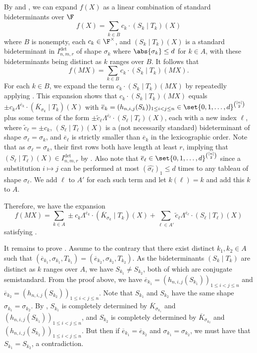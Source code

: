 \documentclass[letterpaper, 11pt]{amsart}
\begin{document}
\begin{pf}
By  and , we can expand $f(X)$ as a linear combination of standard bideterminants over $\F$
\[
    f(X)=\sum_{k \in B} c_k \cdot (S_k\mid T_k)(X)
\]
where $B$ is nonempty, each $c_k \in \F^\times$, and $(S_k \mid T_k)(X)$ is a standard bideterminant in $I^{\det}_{n,m,r}$ of shape $\sigma_k$ where $\abs{\sigma_k} \leq d$ for $k \in A$, with these bideterminants being distinct as $k$ ranges over $B$.
It follows that 
\[
    f(MX)=\sum_{k\in B} c_k \cdot (S_k\mid T_k)(MX).
\]
For each $k\in B$, we expand the term $c_k \cdot (S_k\mid T_k)(MX)$ by repeatedly applying .
This expansion shows that $c_k \cdot (S_k\mid T_k)(MX)$ equals $\pm c_k \Lambda^{\overline{e}_k}\cdot (\overline{K}_{\sigma_k}\mid T_k)(X)$ with $\overline{e}_k=(h_{n,i,j}(S_k))_{1\leq i<j\leq n} \in \set{0, 1, \dots, d}^{\binom{[n]}{2}}$ plus some terms of the form $\pm \widetilde{c}_{\ell}\Lambda^{\overline{e}_\ell}\cdot (S_\ell\mid T_\ell)(X)$, each with a new index $\ell$,
where $\widetilde{c}_{\ell}=\pm c_k$, $(S_\ell\mid T_\ell)(X)$ is a (not necessarily standard) bideterminant of shape $\sigma_\ell=\sigma_k$, and $\overline{e}_\ell$ is strictly smaller than $\overline{e}_k$ in the lexicographic order.
Note that as $\sigma_\ell=\sigma_k$, their first rows both have length at least $r$, implying that $(S_\ell\mid T_\ell)(X)\in I^{\det}_{n,m,r}$ by .
Also note that $\overline{e}_\ell \in \set{0, 1, \dots, d}^{\binom{[n]}{2}}$ since a substitution $i\mapsto j$ can be performed at most $(\widehat{\sigma_\ell})_1\leq d$ times to any tableau of shape $\sigma_\ell$.
We add $\ell$ to $A'$ for each such term and let $k(\ell) = k$ and add this $k$ to $A$.

Therefore, we have the expansion
\[
    f(MX) = \sum_{k \in A} \pm{c}_{k} \Lambda^{\overline{e}_k}\cdot (\overline{K}_{\sigma_k}\mid T_k)(X) + \sum_{\ell\in A'} \widetilde{c}_{\ell} \Lambda^{\overline{e}_\ell}\cdot (S_\ell\mid T_\ell)(X)
\]
satisfying .

It remains to prove .
Assume to the contrary that there exist distinct $k_1,k_2\in A$ such that $(\overline{e}_{k_1},\sigma_{k_1},T_{k_1})=(\overline{e}_{k_2},\sigma_{k_2},T_{k_2})$.
As the bideterminants $(S_k\mid T_k)$ are distinct as $k$ ranges over $A$, we have $S_{k_1}\neq S_{k_2}$, both of which are conjugate semistandard.
From the proof above, we have $\overline{e}_{k_1}=(h_{n,i,j}(S_{k_1}))_{1\leq i < j \leq n}$
and $\overline{e}_{k_2}=(h_{n,i,j}(S_{k_2}))_{1\leq i<j\leq n}$.
Note that $S_{k_1}$ and $S_{k_2}$ have the same shape $\sigma_{k_1}=\sigma_{k_2}$.
By , $S_{k_1}$ is completely determined by $\overline{K}_{\sigma_{k_1}}$ and $(h_{n,i,j}(S_{k_1}))_{1\leq i<j \leq n}$, and $S_{k_2}$ is completely determined by $\overline{K}_{\sigma_{k_2}}$ and $(h_{n,i,j}(S_{k_2}))_{1\leq i < j \leq n }$.
But then if $\overline{e}_{k_1} = \overline{e}_{k_2}$ and $\sigma_{k_1} = \sigma_{k_2}$, we must have that $S_{k_1} = S_{k_2}$, a contradiction.
\end{pf}
\end{document}
